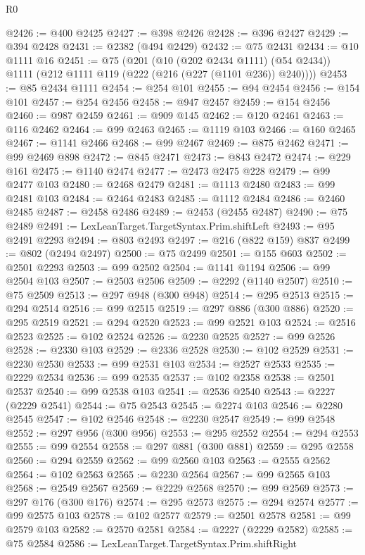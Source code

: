 \begin{lexlean}{R0}
\begin{coremodule}
@2426 := @400 @2425
@2427 := @398 @2426
@2428 := @396 @2427
@2429 := @394 @2428
@2431 := @2382 (@494 @2429)
@2432 := @75 @2431
@2434 := @10 @1111 @16
@2451 := @75
    (@201
      (@10 (@202 @2434 @1111) (@54 @2434))
      @1111
      (@212 @1111 @119 (@222 (@216 (@227 (@1101 @236)) @240))))
@2453 := @85 @2434 @1111
@2454 := @254 @101
@2455 := @94 @2454
@2456 := @154 @101
@2457 := @254 @2456
@2458 := @947 @2457
@2459 := @154 @2456
@2460 := @987 @2459
@2461 := @909 @145
@2462 := @120 @2461
@2463 := @116 @2462
@2464 := @99 @2463
@2465 := @1119 @103
@2466 := @160 @2465
@2467 := @1141 @2466
@2468 := @99 @2467
@2469 := @875 @2462
@2471 := @99 @2469 @898
@2472 := @845 @2471
@2473 := @843 @2472
@2474 := @229 @161
@2475 := @1140 @2474
@2477 := @2473 @2475 @228
@2479 := @99 @2477 @103
@2480 := @2468 @2479
@2481 := @1113 @2480
@2483 := @99 @2481 @103
@2484 := @2464 @2483
@2485 := @1112 @2484
@2486 := @2460 @2485
@2487 := @2458 @2486
@2489 := @2453 (@2455 @2487)
@2490 := @75 @2489
@2491 := LexLeanTarget.TargetSyntax.Prim.shiftLeft
@2493 := @95 @2491 @2293
@2494 := @803 @2493
@2497 := @216 (@822 @159) @837
@2499 := @802 (@2494 @2497)
@2500 := @75 @2499
@2501 := @155 @603
@2502 := @2501 @2293
@2503 := @99 @2502
@2504 := @1141 @1194
@2506 := @99 @2504 @103
@2507 := @2503 @2506
@2509 := @2292 (@1140 @2507)
@2510 := @75 @2509
@2513 := @297 @948 (@300 @948)
@2514 := @295 @2513
@2515 := @294 @2514
@2516 := @99 @2515
@2519 := @297 @886 (@300 @886)
@2520 := @295 @2519
@2521 := @294 @2520
@2523 := @99 @2521 @103
@2524 := @2516 @2523
@2525 := @102 @2524
@2526 := @2230 @2525
@2527 := @99 @2526
@2528 := @2330 @103
@2529 := @2336 @2528
@2530 := @102 @2529
@2531 := @2230 @2530
@2533 := @99 @2531 @103
@2534 := @2527 @2533
@2535 := @2229 @2534
@2536 := @99 @2535
@2537 := @102 @2358
@2538 := @2501 @2537
@2540 := @99 @2538 @103
@2541 := @2536 @2540
@2543 := @2227 (@2229 @2541)
@2544 := @75 @2543
@2545 := @2274 @103
@2546 := @2280 @2545
@2547 := @102 @2546
@2548 := @2230 @2547
@2549 := @99 @2548
@2552 := @297 @956 (@300 @956)
@2553 := @295 @2552
@2554 := @294 @2553
@2555 := @99 @2554
@2558 := @297 @881 (@300 @881)
@2559 := @295 @2558
@2560 := @294 @2559
@2562 := @99 @2560 @103
@2563 := @2555 @2562
@2564 := @102 @2563
@2565 := @2230 @2564
@2567 := @99 @2565 @103
@2568 := @2549 @2567
@2569 := @2229 @2568
@2570 := @99 @2569
@2573 := @297 @176 (@300 @176)
@2574 := @295 @2573
@2575 := @294 @2574
@2577 := @99 @2575 @103
@2578 := @102 @2577
@2579 := @2501 @2578
@2581 := @99 @2579 @103
@2582 := @2570 @2581
@2584 := @2227 (@2229 @2582)
@2585 := @75 @2584
@2586 := LexLeanTarget.TargetSyntax.Prim.shiftRight

\end{coremodule}
\end{lexlean}
